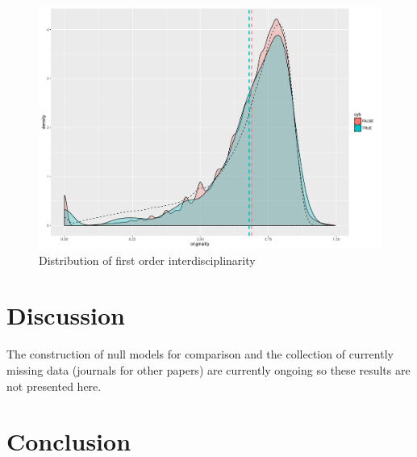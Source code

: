 \begin{figure}
\centering
\includegraphics[width=\textwidth]{figures/firstorderint_withNull}
\caption{Distribution of first order interdisciplinarity}
\label{fig:firstorderint}
\end{figure}













\section{Discussion}
\label{sec:discussion}



The construction of null models for comparison and the collection of currently missing data (journals for other papers) are currently ongoing so these results are not presented here.











\section{Conclusion}
\label{sec:discussion}












